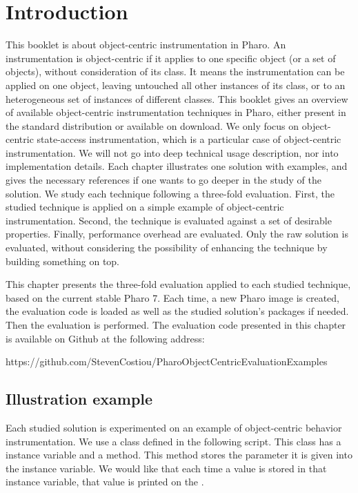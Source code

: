 \documentclass[10pt,twoside,english]{_support/latex/sbabook/sbabook}
\begin{document}
\frontmatter
\pagestyle{plain}

\tableofcontents*
\clearpage\listoffigures

\mainmatter

\chapter{Introduction}
This booklet is about object-centric instrumentation in Pharo. An instrumentation is object-centric if it applies to one specific object (or a set of objects), without consideration of its class. It means the instrumentation can be applied on one object, leaving untouched all other instances of its class, or to an heterogeneous set of instances of different classes. This booklet gives an overview of available object-centric instrumentation techniques in Pharo, either present in the standard distribution or available on download. We only focus on object-centric state-access instrumentation, which is a particular case of object-centric instrumentation. We will not go into deep technical usage description, nor into implementation details. Each chapter illustrates one solution with examples, and gives the necessary references if one wants to go deeper in the study of the solution. We study each technique following a three-fold evaluation. First, the studied technique is applied on a simple example of object-centric instrumentation. Second, the technique is evaluated against a set of desirable properties. Finally, performance overhead are evaluated. Only the raw solution is evaluated, without considering the possibility of enhancing the technique by building something on top.

This chapter presents the three-fold evaluation applied to each studied technique, based on the current stable Pharo 7. Each time, a new Pharo image is created, the evaluation code is loaded as well as the studied solution's packages if needed. Then the evaluation is performed. The evaluation code presented in this chapter is available on Github at the following address:

https://github.com/StevenCostiou/PharoObjectCentricEvaluationExamples
\section{Illustration example}
Each studied solution is experimented on an example of object-centric behavior instrumentation. We use a class  defined in the following script. This class has a  instance variable and a  method. This method stores the parameter it is given into the instance variable. We would like that each time a value is stored in that instance variable, that value is printed on the .
\end{document}
